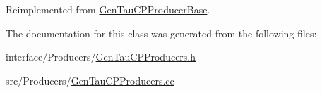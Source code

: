 Reimplemented from \hyperlink{classGenTauCPProducerBase_a99bde6a5233f6794dfac7a744dfa69c5}{GenTauCPProducerBase}.

The documentation for this class was generated from the following files:\begin{DoxyCompactItemize}
\item 
interface/Producers/\hyperlink{GenTauCPProducers_8h}{GenTauCPProducers.h}\item 
src/Producers/\hyperlink{GenTauCPProducers_8cc}{GenTauCPProducers.cc}\end{DoxyCompactItemize}

